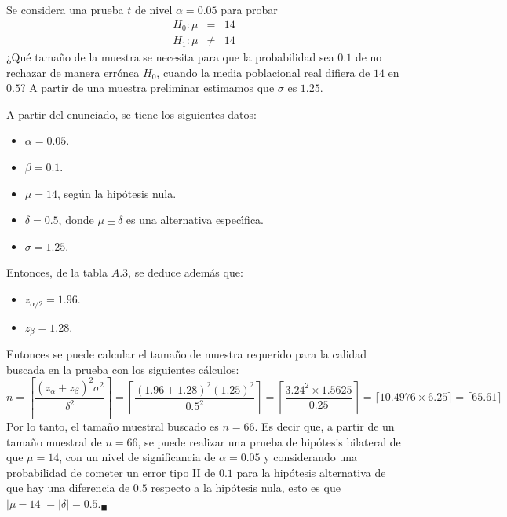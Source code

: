 \begin{enunciado}
 Se considera una prueba $t$ de nivel $\alpha = 0.05$ para probar
 \begin{eqnarray*}
  H_0: \mu & = & 14 \\
  H_1: \mu & \neq & 14
 \end{eqnarray*}
 ¿Qu\'e tama\~no de la muestra se necesita para que la probabilidad sea $0.1$ de no rechazar de manera err\'onea $H_0$, cuando la media poblacional real difiera de $14$ en $0.5$? A partir de una muestra preliminar estimamos que $\sigma$ es $1.25$.
\end{enunciado}

\begin{solucion}
 A partir del enunciado, se tiene los siguientes datos:
 \begin{itemize}
  \item $\alpha = 0.05$.
  \item $\beta = 0.1$.
  \item $\mu = 14$, seg\'un la hip\'otesis nula.
  \item $\delta = 0.5$, donde $\mu \pm \delta$
  es una alternativa espec\'{\i}fica.
  \item $\sigma = 1.25$.
 \end{itemize}
 Entonces, de la tabla $A.3$, se deduce adem\'as que:
 \begin{itemize}
  \item $z_{\alpha/2} = 1.96$.
  \item $z_{\beta} = 1.28$.
 \end{itemize}
 Entonces se puede calcular el tama\~no de muestra requerido
 para la calidad buscada en la prueba
 con los siguientes c\'alculos:
 \begin{equation*}
  n =
  \left\lceil
  \frac{
  \left( z_{\alpha} + z_{\beta} \right)^2 \sigma^2
  }{
  \delta^2
  }
  \right\rceil
  =
  \left\lceil \frac{(1.96+1.28)^2(1.25)^2}{0.5^2} \right\rceil
  = \left\lceil \frac{3.24^2\times 1.5625}{0.25} \right\rceil
  = \lceil 10.4976 \times 6.25 \rceil
  = \lceil 65.61 \rceil
 \end{equation*}
 Por lo tanto, el tama\~no muestral buscado es $n = 66$.
 Es decir que, a partir de un tama\~no muestral de $n = 66$,
 se puede realizar una prueba de hip\'otesis bilateral de que $\mu = 14$,
 con un nivel de significancia de $\alpha = 0.05$
 y considerando una probabilidad de cometer un error tipo II de $0.1$
 para la hip\'otesis alternativa de que hay una diferencia de $0.5$
 respecto a la hip\'otesis nula,
 esto es que $|\mu - 14| = |\delta| = 0.5$.${}_{\blacksquare}$
\end{solucion}
